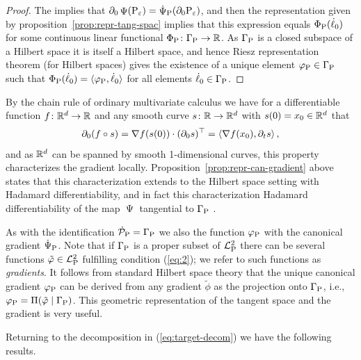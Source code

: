 \documentclass[a4,danish]{article}
\DeclareMathOperator{\TT}{\Psi}
\newcommand{\lp}{\mathcal{L}_{\P}^2} %
\begin{document}
\begin{proof}
  The  implies that
  $\partial_0 \TT(\P_{\epsilon}) = \dot{\TT}_{\P}(\partial_0 \P_{\epsilon})$, and then the
  representation given by proposition~\ref{prop:repr-tang-spac} implies that this expression equals
  $\Phi_{\P}(\dot{\ell}_0)$ for some continuous linear functional
  $\Phi_{\P} \colon \Gamma_{\P} \rightarrow \R$. As $\Gamma_{\P}$ is a closed subspace of a Hilbert
  space it is itself a Hilbert space, and hence Riesz representation theorem (for Hilbert spaces)
  gives the existence of a unique element $\phi_{\P} \in \Gamma_{\P}$ such that
  $\Phi_{\P}(\dot{\ell}_0) = \langle\phi_{\P}, \dot{\ell}_0\rangle$ for all elements
  $\dot{\ell}_0 \in \Gamma_{\P}$.
\end{proof}

By the chain rule of ordinary multivariate calculus we have for a differentiable function
$f\colon\R^d \rightarrow \R$ and any smooth curve $s\colon\R\rightarrow \R^d$ with
$s(0) = x_0 \in \R^d$ that
\begin{equation*}
  \partial_{0} (f\circ s) = \nabla f(s(0)) \cdot (\partial_{0}s )^{\T}
  =
  \left\langle
    \nabla f(x_0) ,  \partial_{t}s 
  \right\rangle,
\end{equation*}
and as $\R^d$ can be spanned by smooth 1-dimensional curves, this property characterizes the
gradient locally. Proposition~\ref{prop:repr-can-gradient} above states that this characterization
extends to the Hilbert space setting with Hadamard differentiability, and in fact this
characterization  Hadamard differentiability
of the map $\TT$ tangential to $\Gamma_{\P}$ \citep[A.5]{bickel1993efficient}.

As with the identification $\dot{\mathcal{P}}_{\P}= \Gamma_{\P}$ we also  the
function $\phi_{\P}$ with the canonical gradient $\dot{\Psi}_{\P}$. Note that if $\Gamma_{\P}$ is a
proper subset of $\lp$ there can be several functions $\tilde{\phi} \in \lp$ fulfilling condition
(\ref{eq:2}); we refer to such functions as \textit{gradients}. It follows from standard Hilbert
space theory that the unique canonical gradient $\phi_{\P}$ can be derived from any gradient
$\tilde{\phi}$ as the projection onto $\Gamma_{\P}$, i.e.,
$ \phi_{\P} = \Pi(\tilde{\phi} \mid \Gamma_{\P})$. This geometric representation of the tangent
space and the gradient is very useful.

Returning to the decomposition in (\ref{eq:target-decom}) we have the following results.
\end{document}
